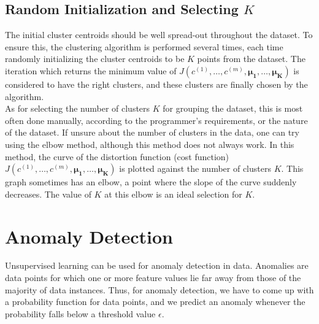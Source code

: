 \documentclass[a4paper, 12pt]{article}
\begin{document}
\subsection{Random Initialization and Selecting $K$}
The initial cluster centroids should be well spread-out throughout the dataset. To ensure this, the clustering algorithm is performed several times, each time randomly initializing the cluster centroids to be $K$ points from the dataset. The iteration which returns the minimum value of $J\left(c^{\left(1\right)}, \dots, c^{\left(m\right)}, \bm{\mu_1}, \dots, \bm{\mu_K}\right)$ is considered to have the right clusters, and these clusters are finally chosen by the algorithm. \\
\break
As for selecting the number of clusters $K$ for grouping the dataset, this is most often done manually, according to the programmer's requirements, or the nature of the dataset. If unsure about the number of clusters in the data, one can try using the elbow method, although this method does not always work. In this method, the curve of the distortion function (cost function) $J\left(c^{\left(1\right)}, \dots, c^{\left(m\right)}, \bm{\mu_1}, \dots, \bm{\mu_K}\right)$ is plotted against the number of clusters $K$. This graph sometimes has an elbow, a point where the slope of the curve suddenly decreases. The value of $K$ at this elbow is an ideal selection for $K$.


\section{Anomaly Detection}
Unsupervised learning can be used for anomaly detection in data. Anomalies are data points for which one or more feature values lie far away from those of the majority of data instances. Thus, for anomaly detection, we have to come up with a probability function for data points, and we predict an anomaly whenever the probability falls below a threshold value $\epsilon$. 
\end{document}

